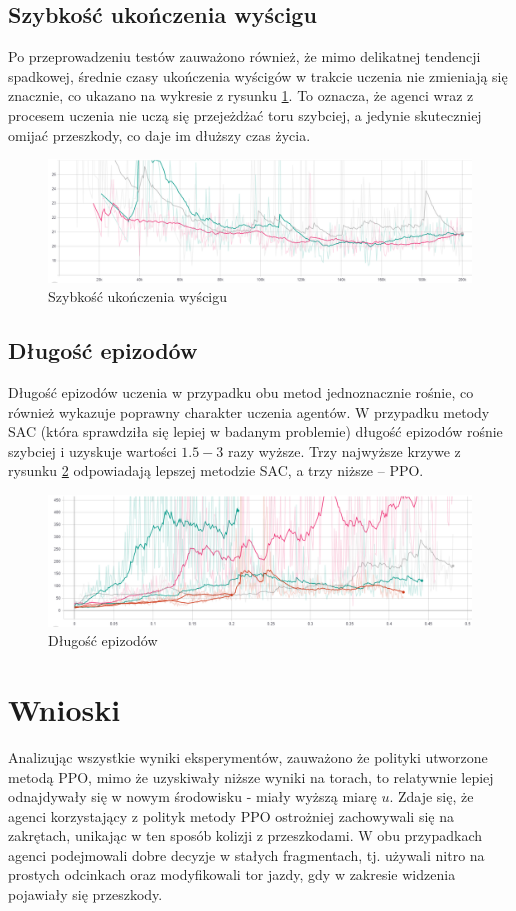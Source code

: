 \documentclass[a4paper,12pt]{article}
\let\oldsection\section
\renewcommand\section{\clearpage\oldsection}
\begin{document}
\subsection{Szybkość ukończenia wyścigu}
Po przeprowadzeniu testów zauważono również, że mimo delikatnej tendencji spadkowej, średnie czasy ukończenia wyścigów w trakcie uczenia nie zmieniają się znacznie, co ukazano na wykresie z rysunku \ref{pic:szybkosc}. To oznacza, że agenci wraz z procesem uczenia nie uczą się przejeżdżać toru szybciej, a jedynie skuteczniej omijać przeszkody, co daje im dłuższy czas życia.
\begin{figure}[H]
	\centering
	\includegraphics[width=\textwidth]{szybkosc}
	\caption{Szybkość ukończenia wyścigu}
	\label{pic:szybkosc}
\end{figure}

\subsection{Długość epizodów}
Długość epizodów uczenia w przypadku obu metod jednoznacznie rośnie, co również wykazuje poprawny charakter uczenia agentów. W przypadku metody SAC (która sprawdziła się lepiej w badanym problemie) długość epizodów rośnie szybciej i uzyskuje wartości $1.5-3$ razy wyższe. Trzy najwyższe krzywe z rysunku \ref{pic:length} odpowiadają lepszej metodzie SAC, a trzy niższe -- PPO.
\begin{figure}[H]
	\centering
	\includegraphics[width=\textwidth]{episode_length}
	\caption{Długość epizodów}
	\label{pic:length}
\end{figure}


\section{Wnioski}
Analizując wszystkie wyniki eksperymentów, zauważono że polityki utworzone metodą PPO, mimo że uzyskiwały niższe wyniki na torach, to relatywnie lepiej odnajdywały się w nowym środowisku - miały wyższą miarę $u$. Zdaje się, że agenci korzystający z polityk metody PPO ostrożniej zachowywali się na zakrętach, unikając w ten sposób kolizji z przeszkodami. W obu przypadkach agenci podejmowali dobre decyzje w stałych fragmentach, tj. używali nitro na prostych odcinkach oraz modyfikowali tor jazdy, gdy w zakresie widzenia pojawiały się przeszkody.
\end{document}
